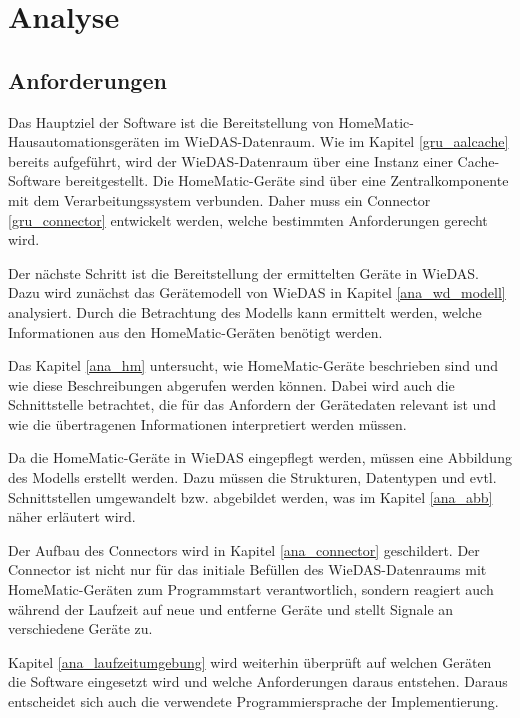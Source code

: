 
\chapter{Analyse}
\label{analyse}

\section{Anforderungen}
\label{ana_anforderungen}

Das Hauptziel der Software ist die Bereitstellung von HomeMatic-Hausautomationsgeräten
im WieDAS-Datenraum.
Wie im Kapitel \ref{gru_aalcache} bereits aufgeführt, wird der WieDAS-Datenraum über eine Instanz
einer Cache-Software bereitgestellt.
Die HomeMatic-Geräte sind über eine Zentralkomponente mit dem Verarbeitungssystem verbunden.
Daher muss ein Connector \ref{gru_connector} entwickelt werden, welche bestimmten Anforderungen
gerecht wird.

Der nächste Schritt ist die Bereitstellung der ermittelten Geräte in WieDAS.
Dazu wird zunächst das Gerätemodell von WieDAS in Kapitel \ref{ana_wd_modell} analysiert.
Durch die Betrachtung des Modells kann ermittelt werden, welche Informationen aus den HomeMatic-Geräten
benötigt werden.

Das Kapitel \ref{ana_hm} untersucht, wie HomeMatic-Geräte beschrieben sind und wie diese
Beschreibungen abgerufen werden können.
Dabei wird auch die Schnittstelle betrachtet, die für das Anfordern der Gerätedaten relevant ist und
wie die übertragenen Informationen interpretiert werden müssen.

Da die HomeMatic-Geräte in WieDAS eingepflegt werden, müssen eine Abbildung des Modells erstellt werden.
Dazu müssen die Strukturen, Datentypen und evtl. Schnittstellen umgewandelt bzw. abgebildet werden,
was im Kapitel \ref{ana_abb} näher erläutert wird.

Der Aufbau des Connectors wird in Kapitel \ref{ana_connector} geschildert.
Der Connector ist nicht nur für das initiale Befüllen des WieDAS-Datenraums mit HomeMatic-Geräten
zum Programmstart verantwortlich, sondern reagiert auch während der Laufzeit auf neue und entferne Geräte
und stellt Signale an verschiedene Geräte zu.

Kapitel \ref{ana_laufzeitumgebung} wird weiterhin überprüft auf welchen Geräten die Software eingesetzt wird
und welche Anforderungen daraus entstehen.
Daraus entscheidet sich auch die verwendete Programmiersprache der Implementierung.

